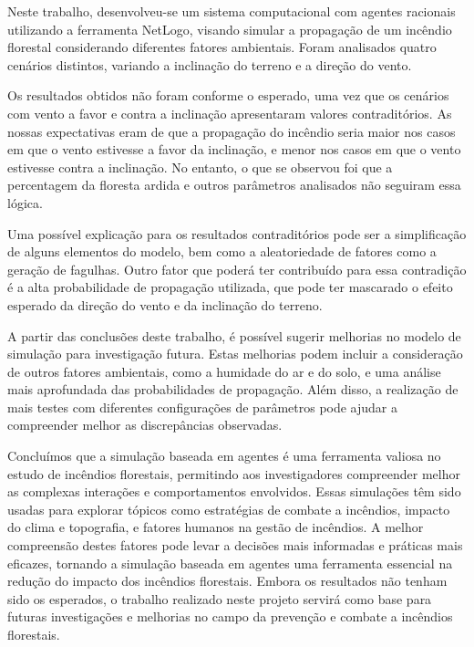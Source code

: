 Neste trabalho, desenvolveu-se um sistema computacional com agentes racionais utilizando a ferramenta NetLogo, visando simular a propagação de um incêndio florestal considerando diferentes fatores ambientais.
Foram analisados quatro cenários distintos, variando a inclinação do terreno e a direção do vento.

Os resultados obtidos não foram conforme o esperado, uma vez que os cenários com vento a favor e contra a inclinação apresentaram valores contraditórios.
As nossas expectativas eram de que a propagação do incêndio seria maior nos casos em que o vento estivesse a favor da inclinação, e menor nos casos em que o vento estivesse contra a inclinação.
No entanto, o que se observou foi que a percentagem da floresta ardida e outros parâmetros analisados não seguiram essa lógica.

Uma possível explicação para os resultados contraditórios pode ser a simplificação de alguns elementos do modelo, bem como a aleatoriedade de fatores como a geração de fagulhas.
Outro fator que poderá ter contribuído para essa contradição é a alta probabilidade de propagação utilizada, que pode ter mascarado o efeito esperado da direção do vento e da inclinação do terreno.

A partir das conclusões deste trabalho, é possível sugerir melhorias no modelo de simulação para investigação futura.
Estas melhorias podem incluir a consideração de outros fatores ambientais, como a humidade do ar e do solo, e uma análise mais aprofundada das probabilidades de propagação.
Além disso, a realização de mais testes com diferentes configurações de parâmetros pode ajudar a compreender melhor as discrepâncias observadas.

Concluímos que a simulação baseada em agentes é uma ferramenta valiosa no estudo de incêndios florestais, permitindo aos investigadores compreender melhor as complexas interações e comportamentos envolvidos.
Essas simulações têm sido usadas para explorar tópicos como estratégias de combate a incêndios, impacto do clima e topografia, e fatores humanos na gestão de incêndios.
A melhor compreensão destes fatores pode levar a decisões mais informadas e práticas mais eficazes, tornando a simulação baseada em agentes uma ferramenta essencial na redução do impacto dos incêndios florestais.
Embora os resultados não tenham sido os esperados, o trabalho realizado neste projeto servirá como base para futuras investigações e melhorias no campo da prevenção e combate a incêndios florestais.